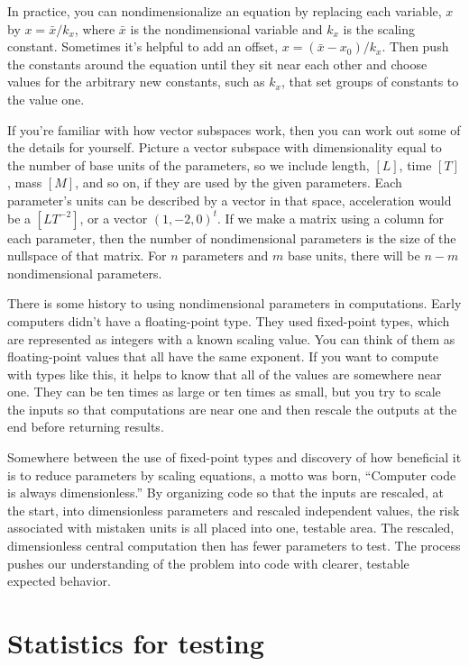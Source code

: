 \documentclass[fleqn,10pt]{olplainarticle}
\begin{document}
In practice, you can nondimensionalize an equation by replacing
each variable, $x$ by $x=\bar{x}/k_x$, where $\bar{x}$ is the
nondimensional variable and $k_x$ is the scaling constant. Sometimes
it's helpful to add an offset, $x=(\bar{x} - x_0)/k_x$. Then
push the constants around the equation until they sit near each
other and choose values for the arbitrary new constants, such as $k_x$,
that set groups of constants to the value one.

If you're familiar with how vector subspaces work, then
you can work out some of the details for yourself.
Picture a vector subspace with dimensionality equal to the
number of base units of the parameters, so we include
length, $[L]$, time $[T]$, mass $[M]$, and so on, if they are used
by the given parameters. Each parameter's units can be described
by a vector in that space, acceleration would be a $[LT^{-2}]$, or
a vector $(1, -2, 0)^t$. If we make a matrix using a column
for each parameter, then the number of nondimensional parameters
is the size of the nullspace of that matrix. For $n$ parameters
and $m$ base units, there will be $n-m$ nondimensional parameters.

There is some history to using nondimensional parameters in
computations. Early computers didn't have a floating-point type.
They used fixed-point types, which are represented as integers
with a known scaling value. You can think of them as floating-point
values that all have the same exponent. If you want to compute
with types like this, it helps to know that all of the values
are somewhere near one. They can be ten times as large or ten
times as small, but you try to scale the inputs so that
computations are near one and then rescale the outputs at
the end before returning results.

Somewhere between the use of fixed-point types and discovery
of how beneficial it is to reduce parameters by scaling
equations, a motto was born, ``Computer code is always
dimensionless.'' By organizing code so that the inputs are
rescaled, at the start, into dimensionless parameters and
rescaled independent values, the risk associated with
mistaken units is all placed into one, testable area.
The rescaled, dimensionless central computation then has
fewer parameters to test. The process pushes our understanding
of the problem into code with clearer, testable expected
behavior.


\section{Statistics for testing}\label{sec:statistical}
\end{document}
